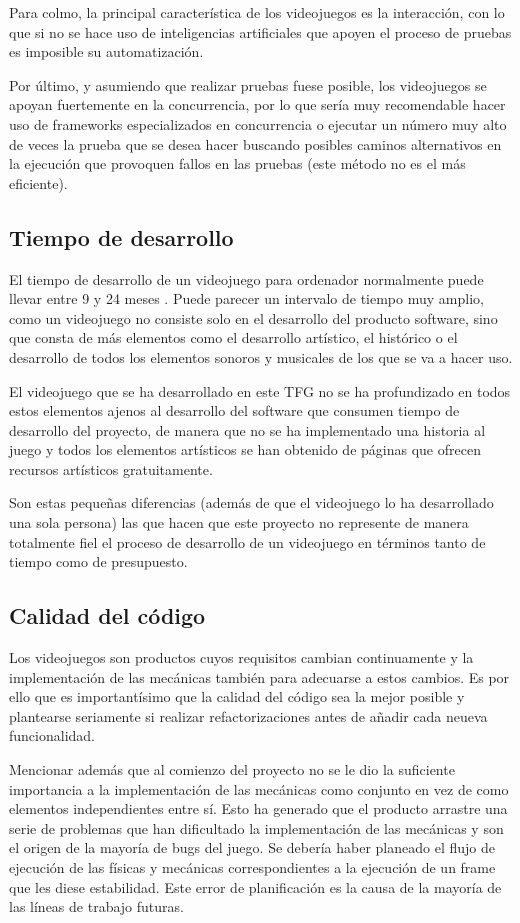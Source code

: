 Para colmo, la principal característica de los videojuegos es la interacción, con lo que si no se hace uso de inteligencias artificiales que apoyen el proceso de pruebas es imposible su automatización.

Por último, y asumiendo que realizar pruebas fuese posible, los videojuegos se apoyan fuertemente en la concurrencia, por lo que sería muy recomendable hacer uso de frameworks especializados en concurrencia o ejecutar un número muy alto de veces la prueba que se desea hacer buscando posibles caminos alternativos en la ejecución que provoquen fallos en las pruebas (este método no es el más eficiente).

\subsection{Tiempo de desarrollo}
El tiempo de desarrollo de un videojuego para ordenador normalmente puede llevar entre 9 y 24 meses \cite{TiempoDesarrollo}. Puede parecer un intervalo de tiempo muy amplio, como un videojuego no consiste solo en el desarrollo del producto software, sino que consta de más elementos como el desarrollo artístico, el histórico o el desarrollo de todos los elementos sonoros y musicales de los que se va a hacer uso.

El videojuego que se ha desarrollado en este TFG no se ha profundizado en todos estos elementos ajenos al desarrollo del software que consumen tiempo de desarrollo del proyecto, de manera que no se ha implementado una historia al juego y todos los elementos artísticos se han obtenido de páginas que ofrecen recursos artísticos gratuitamente.

Son estas pequeñas diferencias (además de que el videojuego lo ha desarrollado una sola persona) las que hacen que este proyecto no represente de manera totalmente fiel el proceso de desarrollo de un videojuego en términos tanto de tiempo como de presupuesto.

\subsection{Calidad del código}
Los videojuegos son productos cuyos requisitos cambian continuamente y la implementación de las mecánicas también para adecuarse a estos cambios. Es por ello que es importantísimo que la calidad del código sea la mejor posible y plantearse seriamente si realizar refactorizaciones antes de añadir cada neueva funcionalidad.

Mencionar además que al comienzo del proyecto no se le dio la suficiente importancia a la implementación de las mecánicas como conjunto en vez de como elementos independientes entre sí. Esto ha generado que el producto arrastre una serie de problemas que han dificultado la implementación de las mecánicas y son el origen de la mayoría de bugs del juego.
Se debería haber planeado el flujo de ejecución de las físicas y mecánicas correspondientes a la ejecución de un frame que les diese estabilidad. Este error de planificación es la causa de la mayoría de las líneas de trabajo futuras.

